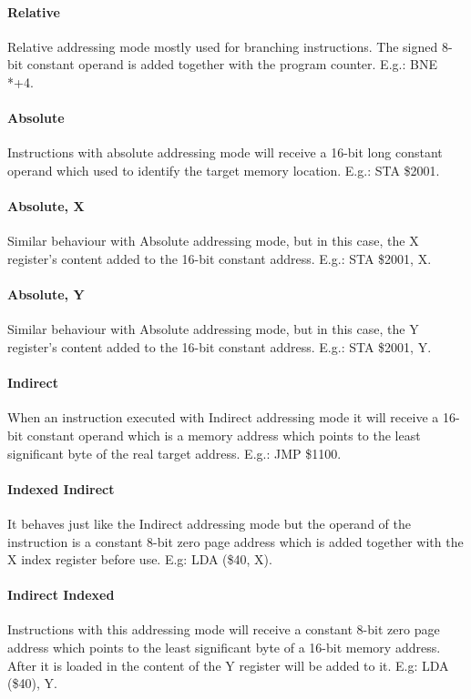 \documentclass[]{report}
\begin{document}
\paragraph{Relative}
Relative addressing mode mostly used for branching instructions. The signed 8-bit constant operand is added together with the program counter. E.g.: BNE *+4.

\paragraph{Absolute}
Instructions with absolute addressing mode will receive a 16-bit long constant operand which used to identify the target memory location. E.g.: STA \$2001.

\paragraph{Absolute, X}
Similar behaviour with Absolute addressing mode, but in this case, the X register's content added to the 16-bit constant address. E.g.: STA \$2001, X.

\paragraph{Absolute, Y}
Similar behaviour with Absolute addressing mode, but in this case, the Y register's content added to the 16-bit constant address. E.g.: STA \$2001, Y.

\paragraph{Indirect}
When an instruction executed with Indirect addressing mode it will receive a 16-bit constant operand which is a memory address which points to the least significant byte of the real target address. E.g.: JMP \$1100.

\paragraph{Indexed Indirect}
It behaves just like the Indirect addressing mode but the operand of the instruction is a constant 8-bit  zero page address which is added together with the X index register before use. E.g:  LDA (\$40, X).

\paragraph{Indirect Indexed}
Instructions with this addressing mode will receive a constant 8-bit zero page address which points to the least significant byte of a 16-bit memory address. After it is loaded in the content of the Y register will be added to it. E.g: LDA (\$40), Y.
\end{document}
